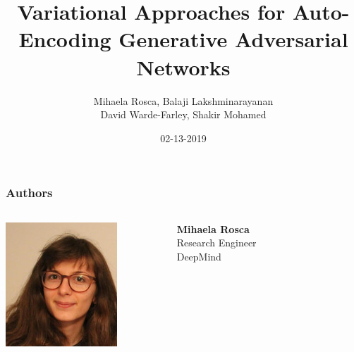 \documentclass[compress]{beamer}
\title{Variational Approaches for Auto-Encoding Generative Adversarial Networks}
\author[Presentor: Shih-Ming Wang]{Mihaela Rosca, Balaji Lakshminarayanan \\ David Warde-Farley, Shakir Mohamed}
\institute[]{Presented by Shih-Ming Wang \\ ComputerVision Lab, UCSC}
\date{02-13-2019}
\begin{document}
\begin{frame}
    \maketitle
    \hypertarget{titlePage}{}
\end{frame}

\begin{frame}
\frametitle{Authors}

\begin{columns}
    \begin{column}{.3\textwidth}
        \includegraphics[width=\textwidth]{auth1} 
    \end{column}
    \begin{column}{.2\textwidth}
        \tiny
        \textbf{Mihaela Rosca} \\
        Research Engineer \\
        DeepMind \\
    \end{column}
    \begin{column}{.3\textwidth}

\end{column}
\end{columns}
\end{frame}
\end{document}

